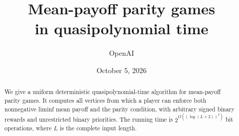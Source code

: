 \documentclass[11pt]{article}
\title{Mean-payoff parity games\\in quasipolynomial time}
\author{OpenAI}
\date{October 5, 2026}
\begin{document}
\maketitle
\begin{abstract}
We give a uniform deterministic quasipolynomial-time algorithm for
mean-payoff parity games. It computes all vertices from which a player
can enforce both nonnegative liminf mean payoff and the parity condition,
with arbitrary signed binary rewards and unrestricted binary priorities.
The running time is $2^{O((\log(L+2))^2)}$ bit operations, where $L$ is
the complete input length.
\end{abstract}







\end{document}
